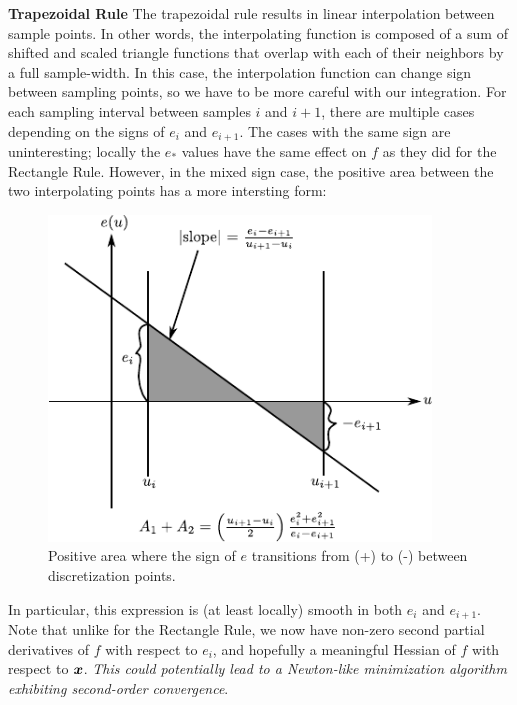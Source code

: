\documentclass[12pt,journal,draftcls,letterpaper,onecolumn]{IEEEtran}
\begin{document}
{\bf Trapezoidal Rule}  The trapezoidal rule results in linear interpolation between sample points.  In other words, the interpolating function is composed of a sum of shifted and scaled triangle functions that overlap with each of their neighbors by a full sample-width.  In this case, the interpolation function can change sign between sampling points, so we have to be more careful with our integration.  For each sampling interval between samples $i$ and $i+1$, there are multiple cases depending on the signs of $e_i$ and $e_{i+1}$.  The cases with the same sign are uninteresting; locally the $e_*$ values have the same effect on $f$ as they did for the Rectangle Rule.  However, in the mixed sign case, the positive area between the two interpolating points has a more intersting form:
\begin{figure}
 \centering
 \includegraphics[width=4in]{bowtie.pdf}
 \caption{Positive area where the sign of $e$ transitions from (+) to (-) between discretization points.}
 \label{fig:bowtie}
\end{figure}
In particular, this expression is (at least locally) smooth in both $e_i$ and $e_{i+1}$.  Note that unlike for the Rectangle Rule, we now have non-zero second partial derivatives of $f$ with respect to $e_i$, and hopefully a meaningful Hessian of $f$ with respect to ${\boldsymbol{x}}$.  {\em This could potentially lead to a Newton-like minimization algorithm exhibiting second-order convergence}.  
\end{document}
